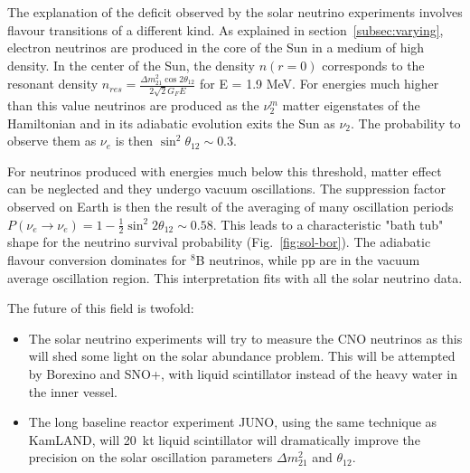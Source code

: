 The explanation of the deficit observed by the solar neutrino experiments involves flavour transitions of a different kind. As explained in section~\ref{subsec:varying}, electron neutrinos are produced in the core of the Sun in a medium of high density. 
In the center of the Sun, the density $n(r=0)$ corresponds to the resonant density $ n_{res}= \frac{\Delta m^2_{21} \cos 2 \theta_{12}}{ 2 \sqrt{2}G_F E}$ for E = 1.9 MeV. For energies much higher than this value
neutrinos are produced as the $ \nu^m_2$ matter eigenstates of the Hamiltonian and in its adiabatic evolution exits the Sun as $\nu_2$. The probability to observe them as $\nu_e$ is then $\sin^2 \theta_{12} \sim 0.3$. 

For neutrinos produced with energies much below this threshold, matter effect can be neglected and they undergo vacuum oscillations. The suppression factor observed on Earth is then the result of the averaging of many oscillation periods    
$ P({\nu}_e \rightarrow {\nu}_e ) = 1 - \frac{1}{2} \sin^2 2 \theta_{12} \sim 0.58$. 
This leads to a characteristic "bath tub" shape for the neutrino survival probability (Fig.~\ref{fig:sol-bor}). The adiabatic flavour conversion dominates for $^8$B neutrinos, while pp are in the vacuum average oscillation region. 
This interpretation fits with all the solar neutrino data. 

The future of this field is twofold:
\begin{itemize}
\item The solar neutrino experiments will try to measure the CNO neutrinos as this will shed some light on the solar abundance problem. This will be attempted by Borexino and SNO+, with liquid scintillator instead of the heavy water in the inner vessel. 
\item The long baseline reactor experiment JUNO, using the same technique as KamLAND, will 20~kt liquid scintillator will dramatically improve the precision on the solar oscillation parameters  $\Delta m^2_{21}$ and $\theta_{12}$.
\end{itemize}


